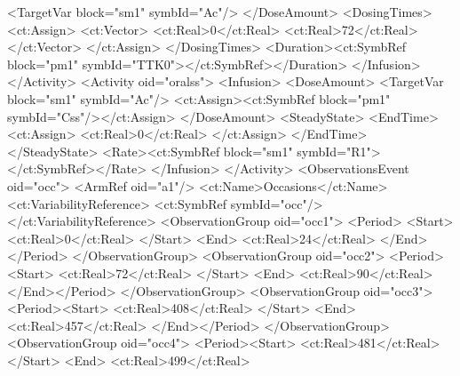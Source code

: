 \documentclass[a4paper,11pt]{article}
\begin{document}
\begin{xmlcode}
                        <TargetVar block="sm1" symbId="Ac"/>
                    </DoseAmount>
                    <DosingTimes>
                        <ct:Assign>
                            <ct:Vector>
                                <ct:Real>0</ct:Real>
                                <ct:Real>72</ct:Real>
                            </ct:Vector>
                        </ct:Assign>
                    </DosingTimes>
                    <Duration><ct:SymbRef block="pm1" symbId="TTK0"></ct:SymbRef></Duration>
                </Infusion>
            </Activity>
            <Activity oid="oralss">
                <Infusion>
                    <DoseAmount>
                        <TargetVar block="sm1" symbId="Ac"/>
                        <ct:Assign><ct:SymbRef block="pm1" symbId="Css"/></ct:Assign>
                    </DoseAmount>
                    <SteadyState>
                        <EndTime>
                            <ct:Assign>
                                <ct:Real>0</ct:Real>
                            </ct:Assign>
                        </EndTime>
                    </SteadyState>
                    <Rate><ct:SymbRef block="sm1" symbId="R1"></ct:SymbRef></Rate>
                </Infusion>
            </Activity>
            <ObservationsEvent oid="occ">
                <ArmRef oid="a1"/>
                <ct:Name>Occasions</ct:Name>
                <ct:VariabilityReference>
                    <ct:SymbRef symbId="occ"/>
                </ct:VariabilityReference>
                <ObservationGroup oid="occ1">
                   <Period> <Start>
                        <ct:Real>0</ct:Real>
                    </Start>
                    <End>
                        <ct:Real>24</ct:Real>
                    </End></Period>
                </ObservationGroup>
                <ObservationGroup oid="occ2">
                    <Period><Start>
                        <ct:Real>72</ct:Real>
                    </Start>
                    <End>
                        <ct:Real>90</ct:Real>
                    </End></Period>
                </ObservationGroup>
                <ObservationGroup oid="occ3">
                    <Period><Start>
                        <ct:Real>408</ct:Real>
                    </Start>
                    <End>
                        <ct:Real>457</ct:Real>
                    </End></Period>
                </ObservationGroup>
                <ObservationGroup oid="occ4">
                    <Period><Start>
                        <ct:Real>481</ct:Real>
                    </Start>
                    <End>
                        <ct:Real>499</ct:Real>

\end{xmlcode}
\end{document}
